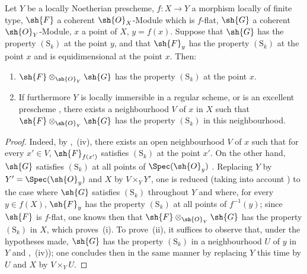 \begin{corollary}[12.1.5]
\label{IV.12.1.5}
Let $Y$ be a locally Noetherian prescheme, $f:X\to Y$ a morphism locally of finite type, $\sh{F}$ a coherent $\sh{O}_X$-Module which is $f$-flat, $\sh{G}$ a coherent $\sh{O}_Y$-Module, $x$ a point of $X$, $y=f(x)$.
Suppose that $\sh{G}$ has the property $(\mathrm{S}_k)$ at the point $y$, and that $\sh{F}_y$ has the property $(\mathrm{S}_k)$ at the point $x$ and is equidimensional at the point $x$.
Then:
\begin{enumerate}[label=(\roman*)]
  \item $\sh{F}\otimes_{\sh{O}_Y}\sh{G}$ has the property $(\mathrm{S}_k)$ at the point $x$.
  \item If furthermore $Y$ is locally immersible in a regular scheme, or is an excellent prescheme , there exists a neighbourhood $V$ of $x$ in $X$ such that $\sh{F}\otimes_{\sh{O}_Y}\sh{G}$ has the property $(\mathrm{S}_k)$ in this neighbourhood.
\end{enumerate}
\end{corollary}

\begin{proof}
Indeed, by ,~(iv), there exists an open neighbourhood $V$ of $x$ such that for every $x'\in V$, $\sh{F}_{f(x')}$ satisfies $(\mathrm{S}_k)$ at the point $x'$.
On the other hand, $\sh{G}$ satisfies $(\mathrm{S}_k)$ at all points of $\Spec(\sh{O}_y)$ .
Replacing $Y$ by $Y'=\Spec(\sh{O}_y)$ and $X$ by $V\times_Y Y'$, one is reduced (taking into account ) to the case where $\sh{G}$ satisfies $(\mathrm{S}_k)$ throughout $Y$ and where, for every $y\in f(X)$, $\sh{F}_y$ has the property $(\mathrm{S}_k)$ at all points of $f^{-1}(y)$; since $\sh{F}$ is $f$-flat, one knows then  that $\sh{F}\otimes_{\sh{O}_Y}\sh{G}$ has the property $(\mathrm{S}_k)$ in $X$, which proves~(i).
To prove~(ii), it suffices to observe that, under the hypotheses made, $\sh{G}$ has the
property $(\mathrm{S}_k)$ in a neighbourhood $U$ of $y$ in $Y$  and ,~(iv)); one concludes then in the same manner by replacing $Y$ this time by $U$ and $X$ by $V\times_Y U$.
\end{proof}

